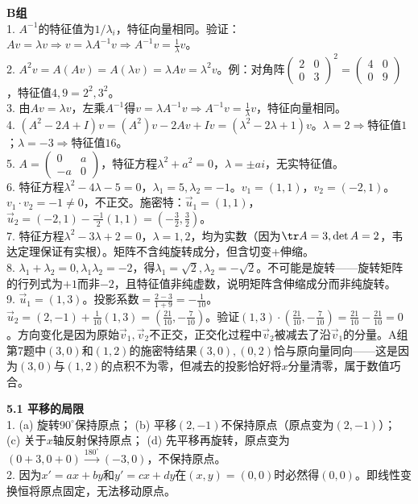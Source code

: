 \noindent\textbf{B组}\\
1. $A^{-1}$的特征值为$1/\lambda_i$，特征向量相同。验证：$A v=\lambda v\Rightarrow v=\lambda A^{-1}v\Rightarrow A^{-1}v=\frac1\lambda v$。\\
2. $A^2 v=A(Av)=A(\lambda v)=\lambda Av=\lambda^2 v$。例：对角阵$\begin{pmatrix}2&0\\0&3\end{pmatrix}^2=\begin{pmatrix}4&0\\0&9\end{pmatrix}$，特征值$4,9=2^2,3^2$。\\
3. 由$A v=\lambda v$，左乘$A^{-1}$得$v=\lambda A^{-1}v\Rightarrow A^{-1}v=\frac1\lambda v$，特征向量相同。\\
4. $(A^2-2A+I)v=(A^2)v-2Av+Iv=(\lambda^2-2\lambda+1)v$。$\lambda=2\Rightarrow$特征值$1$；$\lambda=-3\Rightarrow$特征值$16$。\\
5. $A=\begin{pmatrix}0&a\\-a&0\end{pmatrix}$，特征方程$\lambda^2+a^2=0$，$\lambda=\pm ai$，无实特征值。\\
6. 特征方程$\lambda^2-4\lambda-5=0$，$\lambda_1=5,\lambda_2=-1$。$v_1=(1,1)$，$v_2=(-2,1)$。$v_1\cdot v_2=-1\neq0$，不正交。施密特：$\vec u_1=(1,1)$，$\vec u_2=(-2,1)-\frac{-1}{2}(1,1)=(-\frac32,\frac32)$。\\
7. 特征方程$\lambda^2-3\lambda+2=0$，$\lambda=1,2$，均为实数（因为$\tr A=3,\det A=2$，韦达定理保证有实根）。矩阵不含纯旋转成分，但含切变+伸缩。\\
8. $\lambda_1+\lambda_2=0,\lambda_1\lambda_2=-2$，得$\lambda_1=\sqrt2,\lambda_2=-\sqrt2$。不可能是旋转——旋转矩阵的行列式为$+1$而非$-2$，且特征值非纯虚数，说明矩阵含伸缩成分而非纯旋转。\\
9. $\vec u_1=(1,3)$。投影系数$=\frac{2-3}{1+9}=-\frac1{10}$。$\vec u_2=(2,-1)+\frac1{10}(1,3)=(\frac{21}{10},-\frac{7}{10})$。验证$(1,3)\cdot(\frac{21}{10},-\frac{7}{10})=\frac{21}{10}-\frac{21}{10}=0$。方向变化是因为原始$\vec v_1,\vec v_2$不正交，正交化过程中$\vec v_2$被减去了沿$\vec v_1$的分量。A组第7题中$(3,0)$和$(1,2)$的施密特结果$(3,0),(0,2)$恰与原向量同向——这是因为$(3,0)$与$(1,2)$的点积不为零，但减去的投影恰好将$x$分量清零，属于数值巧合。


\noindent\textbf{5.1 平移的局限}\\
1. (a) 旋转$90^\circ$保持原点； (b) 平移$(2,-1)$不保持原点（原点变为$(2,-1)$）； (c) 关于$x$轴反射保持原点； (d) 先平移再旋转，原点变为$(0+3,0+0)\xrightarrow{180^\circ}(-3,0)$，不保持原点。\\
2. 因为$x'=ax+by$和$y'=cx+dy$在$(x,y)=(0,0)$时必然得$(0,0)$。即线性变换恒将原点固定，无法移动原点。

